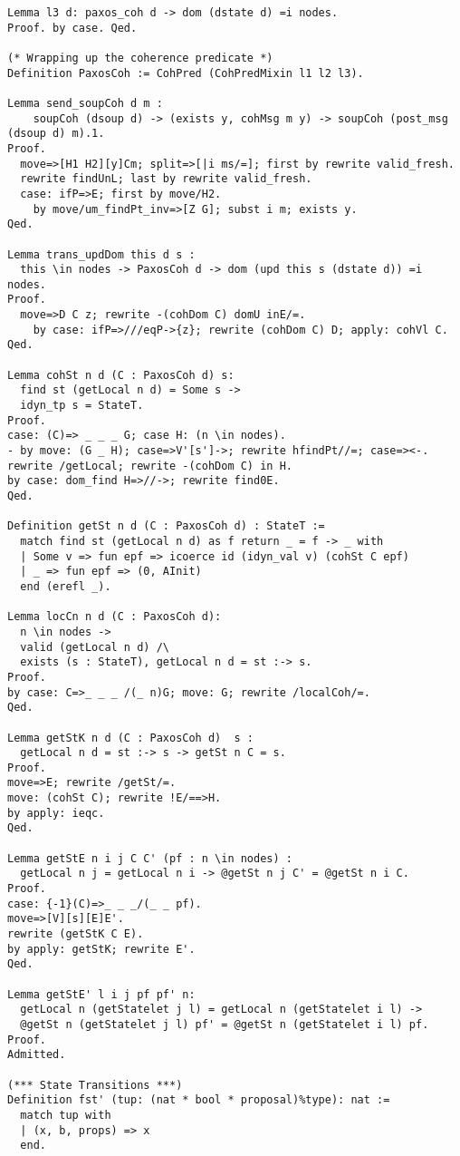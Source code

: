 \begin{landscape}
\begin{multicols*}{2}
\begin{lstlisting}[style=SourceCodeListing]
Lemma l3 d: paxos_coh d -> dom (dstate d) =i nodes.
Proof. by case. Qed.

(* Wrapping up the coherence predicate *)
Definition PaxosCoh := CohPred (CohPredMixin l1 l2 l3).

Lemma send_soupCoh d m :
    soupCoh (dsoup d) -> (exists y, cohMsg m y) -> soupCoh (post_msg (dsoup d) m).1.
Proof.
  move=>[H1 H2][y]Cm; split=>[|i ms/=]; first by rewrite valid_fresh.
  rewrite findUnL; last by rewrite valid_fresh.
  case: ifP=>E; first by move/H2.
    by move/um_findPt_inv=>[Z G]; subst i m; exists y.
Qed.

Lemma trans_updDom this d s :
  this \in nodes -> PaxosCoh d -> dom (upd this s (dstate d)) =i nodes.
Proof.
  move=>D C z; rewrite -(cohDom C) domU inE/=.
    by case: ifP=>///eqP->{z}; rewrite (cohDom C) D; apply: cohVl C.
Qed.

Lemma cohSt n d (C : PaxosCoh d) s:
  find st (getLocal n d) = Some s ->
  idyn_tp s = StateT.
Proof.
case: (C)=> _ _ _ G; case H: (n \in nodes).
- by move: (G _ H); case=>V'[s']->; rewrite hfindPt//=; case=><-.
rewrite /getLocal; rewrite -(cohDom C) in H.
by case: dom_find H=>//->; rewrite find0E.
Qed.

Definition getSt n d (C : PaxosCoh d) : StateT :=
  match find st (getLocal n d) as f return _ = f -> _ with
  | Some v => fun epf => icoerce id (idyn_val v) (cohSt C epf)
  | _ => fun epf => (0, AInit)
  end (erefl _).

Lemma locCn n d (C : PaxosCoh d):
  n \in nodes ->
  valid (getLocal n d) /\
  exists (s : StateT), getLocal n d = st :-> s.
Proof.
by case: C=>_ _ _ /(_ n)G; move: G; rewrite /localCoh/=.
Qed.

Lemma getStK n d (C : PaxosCoh d)  s :
  getLocal n d = st :-> s -> getSt n C = s.
Proof.
move=>E; rewrite /getSt/=.
move: (cohSt C); rewrite !E/==>H.
by apply: ieqc.
Qed.

Lemma getStE n i j C C' (pf : n \in nodes) :
  getLocal n j = getLocal n i -> @getSt n j C' = @getSt n i C.
Proof.
case: {-1}(C)=>_ _ _/(_ _ pf).
move=>[V][s][E]E'.
rewrite (getStK C E).
by apply: getStK; rewrite E'.
Qed.

Lemma getStE' l i j pf pf' n:
  getLocal n (getStatelet j l) = getLocal n (getStatelet i l) ->
  @getSt n (getStatelet j l) pf' = @getSt n (getStatelet i l) pf.
Proof.
Admitted.

(*** State Transitions ***)
Definition fst' (tup: (nat * bool * proposal)%type): nat :=
  match tup with
  | (x, b, props) => x
  end.


\end{lstlisting}
\end{multicols*}
\end{landscape}
